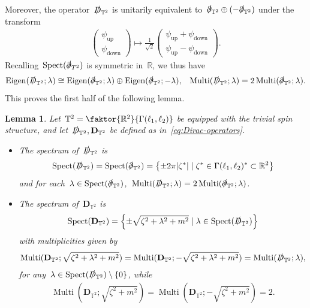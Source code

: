 \documentclass[11pt,final]{amsart}
\newcommand{\R}{\mathbb{R}}
\newcommand{\T}{\mathbb{T}}
\newcommand{\D}{\slashed{D}}
\newcommand{\pd}{\slashed{\partial}}
\newcommand{\pD}{\mathbf{D}}
\newcommand{\braces}[1]{\left\{#1\right\}} %
\DeclareMathOperator{\Eigen}{Eigen}
\DeclareMathOperator{\Mtp}{Multi} %
\DeclareMathOperator{\Spect}{Spect}
\DeclareMathOperator{\up}{up}
\DeclareMathOperator{\down}{down}
\newtheorem{lemma}[thm]{Lemma}
\begin{document}
Moreover, the operator~$\D_{\T^2}$ is unitarily equivalent to~$\pd_{\T^2}\oplus (-\pd_{\T^2})$ under the transform 
\begin{align}
    \begin{pmatrix}\psi_{\up} \\ \psi_{\down} \end{pmatrix}
    \mapsto 
    \frac{1}{\sqrt{2}}
    \begin{pmatrix} \psi_{\up}+\psi_{\down} \\ \psi_{\up}-\psi_{\down} \end{pmatrix}. 
\end{align}
Recalling~$\Spect(\pd_{T^2})$ is symmetric in~$\R$, we thus have 
\begin{align}
    \Eigen(\D_{\T^2};\lambda) \cong \Eigen(\pd_{\T^2};\lambda)\oplus\Eigen(\pd_{\T^2};-\lambda), & & 
    \Mtp(\D_{\T^2};\lambda)= 2\Mtp(\pd_{\T^2};\lambda).
\end{align}
This proves the first half of the following lemma. 

\begin{lemma}\label{lemma:spectrum}
    Let~$\mathbb{T}^2=\faktor{\R^2}{\Gamma(\ell_1,\ell_2)}$ be equipped with the trivial spin structure, and let~$\D_{\T^2}, \pD_{\T^2}$ be defined as in~\eqref{eq:Dirac-operators}. 
    \begin{itemize}
        \item[(i)] The spectrum of~$\D_{\T^2}$ is 
        \begin{align}
            \Spect(\D_{\T^2})= \Spect(\pd_{\T^2})
            =\braces{\pm 2\pi |\zeta^*| \mid \zeta^*\in \Gamma(\ell_1,\ell_2)^*\subset\R^2}
        \end{align}
        and for each~$\lambda\in \Spect(\pd_{\T^2})$,~$\Mtp(\D_{\T^2};\lambda)= 2\Mtp(\pd_{\T^2};\lambda)$.

        \item[(ii)] The spectrum of~$\pD_{\T^2}$ is 
            \begin{align}
                \Spect(\pD_{\T^2})=\braces{ \pm \sqrt{\zeta^2+\lambda^2+m^2} \mid \lambda \in \Spect(\D_{\T^2})} 
            \end{align}
            with multiplicities given by
            \begin{align}
                \Mtp(\pD_{\T^2};\sqrt{\zeta^2+\lambda^2+m^2})
                =\Mtp(\pD_{\T^2};-\sqrt{\zeta^2+\lambda^2+m^2})
                =\Mtp(\D_{\T^2}; \lambda),
            \end{align}
            for any~$\lambda\in \Spect(\D_{\T^2})\setminus \braces{0}$, while 
            \begin{align}
                \Mtp(\pD_{\T^2};\sqrt{\zeta^2+m^2})
                =\Mtp(\pD_{\T^2};-\sqrt{\zeta^2+m^2})=2.
            \end{align}
    \end{itemize}
    
\end{lemma}
\end{document}
